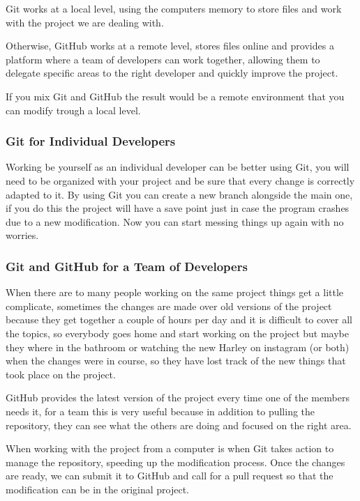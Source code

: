 \documentclass{article}
\begin{document}
	Git works at a local level, using the computers memory to store files and work with the project we are dealing with.\par
	
	Otherwise, GitHub works at a remote level, stores files online and provides a platform where a team of developers can work together, allowing them to delegate specific areas to the right developer and quickly improve the project.\par

    If you mix Git and GitHub the result would be a remote environment that you can modify trough a local level.
    
    \subsubsection{Git for Individual Developers}
    
    Working be yourself as an individual developer can be better using Git, you will need to be organized with your project and be sure that every change is correctly adapted to it. By using Git you can create a new branch alongside the main one, if you do this the project will have a save point just in case the program crashes due to a new modification. Now you can start messing things up again with no worries.
    
    \subsubsection{Git and GitHub for a Team of Developers}
    
    When there are to many people working on the same project things get a little complicate, sometimes the changes are made over old versions of the project because they get together a couple of hours per day and it is difficult to cover all the topics, so everybody goes home and start working on the project but maybe they where in the bathroom or watching the new Harley on instagram (or both) when the changes were in course, so they have lost track of the new things that took place on the project.\par
    
    GitHub provides the latest version of the project every time one of the members needs it, for a team this is very useful because in addition to pulling the repository, they can see what the others are doing and focused on the right area.\par
    
    When working with the project from a computer is when Git takes action to manage the repository, speeding up the modification process. Once the changes are ready, we can submit it to GitHub and call for a pull request so that the modification can be in the original project.
    
\end{document}
